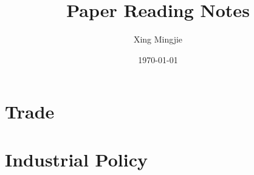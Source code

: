 \usepackage{sectsty}
\allsectionsfont{\rmfamily\bfseries\upshape} %

\usepackage[nottoc,notlof,notlot]{tocbibind} %
\usepackage[titles,subfigure]{tocloft} %
\renewcommand{\cftsecfont}{\rmfamily\mdseries\upshape}
\renewcommand{\cftsecpagefont}{\rmfamily\mdseries\upshape} %

\usepackage[colorlinks,citecolor=black,urlcolor=black,bookmarks=false,hypertexnames=true]{hyperref} 




\title{Paper Reading Notes}
\author{Xing Mingjie}
\date{\today} %


\maketitle

\tableofcontents

\newpage

\section{Trade}
    \subsection{\cite{AkcigitAtesImpullitti2018}}
    
	\subsection{\cite{Fernandesetal2023}}
    
    \subsection{\cite{MartinMejeanParenti2023}}

\section{Industrial Policy}
    \subsection{\cite{JuhaszLaneRodrik2023}}
